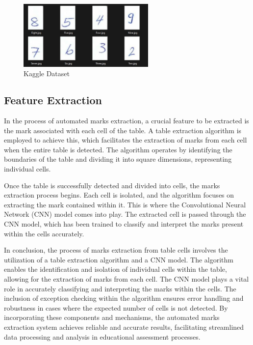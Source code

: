 \begin{figure}[h!]
  \centering
  \includegraphics[width=0.6\textwidth]{Images/Dataset/Kaggle_Dataset_Header.png}
  \caption{Kaggle Dataset}
\end{figure} 

\clearpage

\subsection{Feature Extraction}

In the process of automated marks extraction, a crucial feature to be extracted is the mark associated with each cell of the table. A table extraction algorithm is employed to achieve this, which facilitates the extraction of marks from each cell when the entire table is detected. The algorithm operates by identifying the boundaries of the table and dividing it into square dimensions, representing individual cells.

\noindent Once the table is successfully detected and divided into cells, the marks extraction process begins. Each cell is isolated, and the algorithm focuses on extracting the mark contained within it. This is where the Convolutional Neural Network (CNN) model comes into play. The extracted cell is passed through the CNN model, which has been trained to classify and interpret the marks present within the cells accurately.  

\noindent In conclusion, the process of marks extraction from table cells involves the utilization of a table extraction algorithm and a CNN model. The algorithm enables the identification and isolation of individual cells within the table, allowing for the extraction of marks from each cell. The CNN model plays a vital role in accurately classifying and interpreting the marks within the cells. The inclusion of exception checking within the algorithm ensures e\noindent rror handling and robustness in cases where the expected number of cells is not detected. By incorporating these components and mechanisms, the automated marks extraction system achieves reliable and accurate results, facilitating streamlined data processing and analysis in educational assessment processes.

